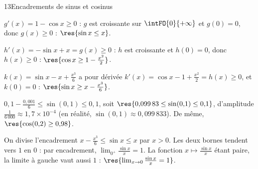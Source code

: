 \begin{corrige}{13}{Encadrements de sinus et cosinus}
\noindent
\begin{minipage}[t]{0.54\linewidth}\vspace{0pt}\raggedright
{}
\begin{questions}
  \item $g'(x)=1-\cos x\geq0$ : $g$ est croissante sur $\intFO{0}{+\infty}$ et $g(0)=0$, donc $g(x)\geq0$ : $\res{\sin x\leq x}$.
  \item $h'(x)=-\sin x+x=g(x)\geq0$ : $h$ est croissante et $h(0)=0$, donc $h(x)\geq0$ : $\res{\cos x\geq1-\frac{x^{2}}{2}}$.
  \item $k(x)=\sin x-x+\frac{x^{3}}{6}$ a pour dérivée $k'(x)=\cos x-1+\frac{x^{2}}{2}=h(x)\geq0$, et $k(0)=0$ : $\res{\sin x\geq x-\frac{x^{3}}{6}}$.
\end{questions}
\begin{questions}[resume]
  \item $0{,}1-\frac{0{,}001}{6}\leq\sin(0{,}1)\leq0{,}1$, soit $\res{0{,}099\,83\leq\sin(0{,}1)\leq0{,}1}$, d'amplitude
    $\frac{1}{6\,000}\approx1{,}7\times10^{-4}$ (en réalité, $\sin(0{,}1)\approx0{,}099\,833$). De même, $\res{\cos(0{,}2)\geq0{,}98}$.
  \item On divise l'encadrement $x-\frac{x^{3}}{6}\leq\sin x\leq x$ par $x>0$. Les deux bornes tendent vers $1$ en $0$ : par
    encadrement, $\lim_{0^{+}}\frac{\sin x}{x}=1$. La fonction $x\mapsto\frac{\sin x}{x}$ étant paire, la limite à gauche vaut aussi
    $1$ : $\res{\lim_{x\to0}\frac{\sin x}{x}=1}$.
\end{questions}
\end{minipage}\hfill
\begin{minipage}[t]{0.42\linewidth}\vspace{2mm}
\centering
{}\\[0.5mm]
\end{minipage}
\end{corrige}
